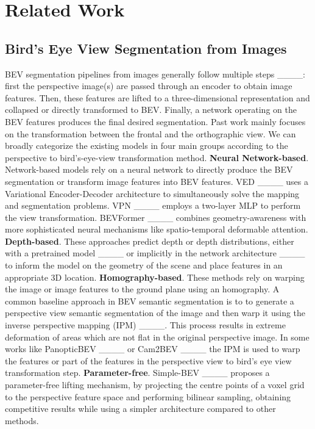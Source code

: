 \section{Related Work}
\label{sec:related work}
\subsection{Bird's Eye View Segmentation from Images}

BEV segmentation pipelines from images generally follow multiple steps ____: first the perspective image(s) are passed through an encoder to obtain image features. Then, these features are lifted to a three-dimensional representation and collapsed or directly transformed to BEV. Finally, a network operating on the BEV features produces the final desired segmentation. Past work mainly focuses on the transformation between the frontal and the orthographic view. 
We can broadly categorize the existing models in four main groups according to the perspective to bird's-eye-view transformation method. 
\textbf{Neural Network-based}. Network-based models rely on a neural network to directly produce the BEV segmentation or transform image features into BEV features. VED ____ uses a Variational Encoder-Decoder architecture to simultaneously solve the mapping and segmentation problems. VPN ____ employs a two-layer MLP to perform the view transformation. BEVFormer ____ combines geometry-awareness with more sophisticated neural mechanisms like spatio-temporal deformable attention.
\textbf{Depth-based}. These approaches predict depth or depth distributions, either with a pretrained model ____ or implicitly in the network architecture ____ to inform the model on the geometry of the scene and place features in an appropriate 3D location. 
\textbf{Homography-based}. These methods rely on warping the image or image features to the ground plane using an homography. A common baseline approach in BEV semantic segmentation is to to generate a perspective view semantic segmentation of the image and then warp it using the inverse perspective mapping (IPM) ____. This process results in extreme deformation of areas which are not flat in the original perspective image. In some works like PanopticBEV ____ or Cam2BEV ____ the IPM is used to warp the features or part of the features in the perspective view to bird's eye view transformation step.
\textbf{Parameter-free}. Simple-BEV ____ proposes a parameter-free lifting mechanism, by projecting the centre points of a voxel grid to the perspective feature space and performing bilinear sampling, obtaining competitive results while using a simpler architecture compared to other methods.

